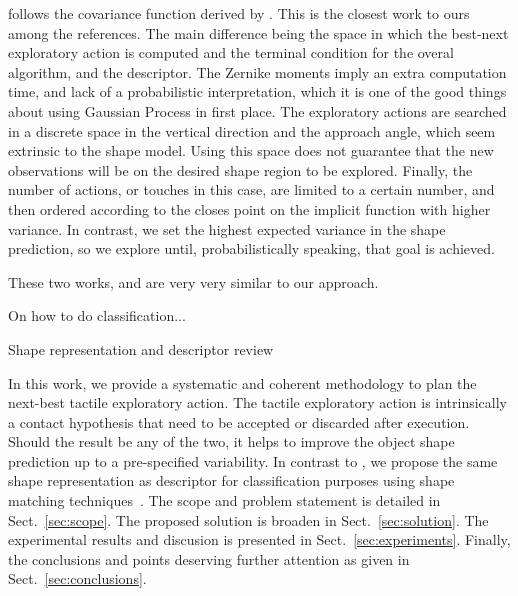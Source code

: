 \citet{Bjorkman2013Enhancing} follows the covariance function derived by \citet{Williams2007Gaussian}. This is the closest work to ours among the references. The main difference being the space in which the best-next exploratory action is computed and the terminal condition for the overal algorithm, and the descriptor. The Zernike moments imply an extra computation time, and lack of a probabilistic interpretation, which it is one of the good things about using Gaussian Process in first place. The exploratory actions are searched in a discrete space in the vertical direction and the approach angle, which seem extrinsic to the shape model. Using this space does not guarantee that the new observations will be on the desired shape region to be explored.  Finally, the number of actions, or touches in this case, are limited to a certain number, and then ordered according to the closes point on the implicit function with higher variance. In contrast, we set the highest expected variance in the shape prediction, so we explore until, probabilistically speaking, that goal is achieved.

These two works, \citet{Bjorkman2013Enhancing} and \cite{Dragiev2013Uncertainty} are very very similar to our approach.



On how to do classification...

Shape representation and descriptor review \citet{Zhang2004Review}

In this work, we provide a systematic and coherent methodology to plan the next-best tactile exploratory action. The tactile exploratory action is intrinsically a contact hypothesis that need to be accepted or discarded after execution. Should the result be any of the two, it helps to improve the object shape prediction up to a pre-specified variability. In contrast to \citet{Bjorkman2013Enhancing}, we propose the same shape representation as descriptor for classification purposes using shape matching techniques~\citep{Belongie2002Shape}. The scope and problem statement is detailed in Sect.~\ref{sec:scope}. The proposed solution is broaden in Sect.~\ref{sec:solution}. The experimental results and discusion is presented in Sect.~\ref{sec:experiments}. Finally, the conclusions and points deserving further attention as given in Sect.~\ref{sec:conclusions}. 
